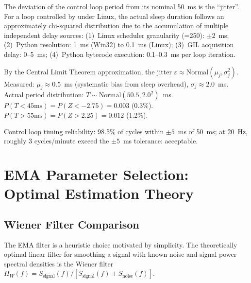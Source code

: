 The deviation of the control loop period from its nominal 50~ms is the ``jitter''. For a loop controlled by  under Linux, the actual sleep duration follows an approximately chi-squared distribution due to the accumulation of multiple independent delay sources: (1)~Linux scheduler granularity (=250): $\pm$2~ms; (2)~Python  resolution: 1~ms (Win32) to 0.1~ms (Linux); (3)~GIL acquisition delay: 0--5~ms; (4)~Python bytecode execution: 0.1--0.3~ms per loop iteration.

\begin{eqblock}
By the Central Limit Theorem approximation, the jitter $\varepsilon\approx\text{Normal}(\mu_j,\sigma_j^2)$. Measured: $\mu_j\approx0.5$~ms (systematic bias from sleep overhead), $\sigma_j\approx2.0$~ms. Actual period distribution: $T\sim\text{Normal}(50.5, 2.0^2)$~ms. $P(T<45\text{ms}) = P(Z<-2.75) = 0.003$ (0.3\%). $P(T>55\text{ms}) = P(Z>2.25) = 0.012$ (1.2\%).

Control loop timing reliability: 98.5\% of cycles within $\pm5$~ms of 50~ms; at 20~Hz, roughly 3 cycles/minute exceed the $\pm5$~ms tolerance: acceptable.
\end{eqblock}

\section{EMA Parameter Selection: Optimal Estimation Theory}

\subsection{Wiener Filter Comparison}

The EMA filter is a heuristic choice motivated by simplicity. The theoretically optimal linear filter for smoothing a signal with known noise and signal power spectral densities is the Wiener filter $H_W(f) = S_{\text{signal}}(f)/[S_{\text{signal}}(f)+S_{\text{noise}}(f)]$.

